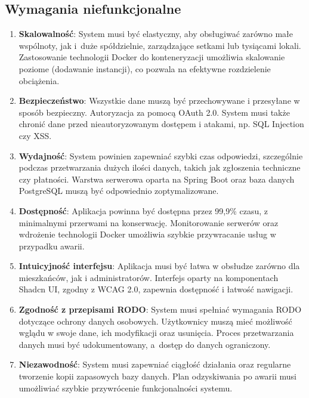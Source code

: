 \subsection{Wymagania niefunkcjonalne}

\begin{enumerate}[label=\arabic*.,labelwidth=\widthof{10}]

   \item \textbf{Skalowalność}: System musi być elastyczny, aby obsługiwać zarówno małe wspólnoty, jak i~duże spółdzielnie, zarządzające setkami lub tysiącami lokali. Zastosowanie technologii Docker do konteneryzacji umożliwia skalowanie poziome (dodawanie instancji), co pozwala na efektywne rozdzielenie obciążenia.

	\item \textbf{Bezpieczeństwo}: Wszystkie dane muszą być przechowywane i przesyłane w sposób bezpieczny. Autoryzacja za pomocą OAuth 2.0. System musi także chronić dane przed nieautoryzowanym dostępem i atakami, np. SQL Injection czy XSS.

	\item \textbf{Wydajność}: System powinien zapewniać szybki czas odpowiedzi, szczególnie podczas przetwarzania dużych ilości danych, takich jak zgłoszenia techniczne czy płatności. Warstwa serwerowa oparta na Spring Boot oraz baza danych PostgreSQL muszą być odpowiednio zoptymalizowane.
	\item \textbf{Dostępność}: Aplikacja powinna być dostępna przez 99,9\% czasu, z minimalnymi przerwami na konserwację. Monitorowanie serwerów oraz wdrożenie technologii Docker umożliwia szybkie przywracanie usług w przypadku awarii.

	\item \textbf{Intuicyjność interfejsu}: Aplikacja musi być łatwa w obsłudze zarówno dla mieszkańców, jak i administratorów. Interfejs oparty na komponentach Shadcn UI, zgodny z WCAG 2.0, zapewnia dostępność i łatwość nawigacji.

	\item \textbf{Zgodność z przepisami RODO}: System musi spełniać wymagania RODO dotyczące ochrony danych osobowych. Użytkownicy muszą mieć możliwość wglądu w swoje dane, ich modyfikacji oraz usunięcia. Proces przetwarzania danych musi być udokumentowany, a~dostęp do danych ograniczony.

	\item \textbf{Niezawodność}: System musi zapewniać ciągłość działania oraz regularne tworzenie kopii zapasowych bazy danych. Plan odzyskiwania po awarii musi umożliwiać szybkie przywrócenie funkcjonalności systemu.


\end{enumerate}

